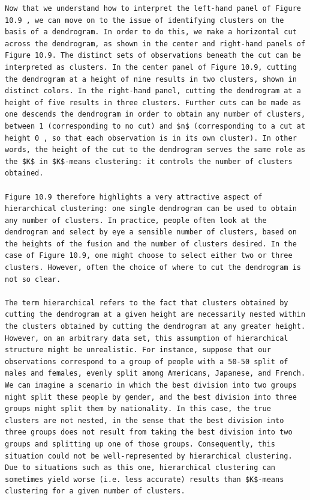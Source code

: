 \documentclass[10pt]{article}
\begin{document}
\begin{verbatim}
Now that we understand how to interpret the left-hand panel of Figure 10.9 , we can move on to the issue of identifying clusters on the basis of a dendrogram. In order to do this, we make a horizontal cut across the dendrogram, as shown in the center and right-hand panels of Figure 10.9. The distinct sets of observations beneath the cut can be interpreted as clusters. In the center panel of Figure 10.9, cutting the dendrogram at a height of nine results in two clusters, shown in distinct colors. In the right-hand panel, cutting the dendrogram at a height of five results in three clusters. Further cuts can be made as one descends the dendrogram in order to obtain any number of clusters, between 1 (corresponding to no cut) and $n$ (corresponding to a cut at height 0 , so that each observation is in its own cluster). In other words, the height of the cut to the dendrogram serves the same role as the $K$ in $K$-means clustering: it controls the number of clusters obtained.

Figure 10.9 therefore highlights a very attractive aspect of hierarchical clustering: one single dendrogram can be used to obtain any number of clusters. In practice, people often look at the dendrogram and select by eye a sensible number of clusters, based on the heights of the fusion and the number of clusters desired. In the case of Figure 10.9, one might choose to select either two or three clusters. However, often the choice of where to cut the dendrogram is not so clear.

The term hierarchical refers to the fact that clusters obtained by cutting the dendrogram at a given height are necessarily nested within the clusters obtained by cutting the dendrogram at any greater height. However, on an arbitrary data set, this assumption of hierarchical structure might be unrealistic. For instance, suppose that our observations correspond to a group of people with a 50-50 split of males and females, evenly split among Americans, Japanese, and French. We can imagine a scenario in which the best division into two groups might split these people by gender, and the best division into three groups might split them by nationality. In this case, the true clusters are not nested, in the sense that the best division into three groups does not result from taking the best division into two groups and splitting up one of those groups. Consequently, this situation could not be well-represented by hierarchical clustering. Due to situations such as this one, hierarchical clustering can sometimes yield worse (i.e. less accurate) results than $K$-means clustering for a given number of clusters.


\end{verbatim}
\end{document}
